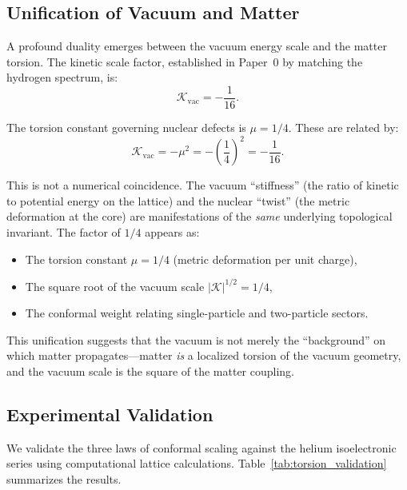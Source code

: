 \documentclass[aps,prd,twocolumn,superscriptaddress,groupedaddress,showpacs]{revtex4-2}
\begin{document}
\subsection{Unification of Vacuum and Matter}

A profound duality emerges between the vacuum energy scale and the matter torsion. The kinetic scale factor, established in Paper~0 by matching the hydrogen spectrum, is:
\begin{equation}
\mathcal{K}_{\text{vac}} = -\frac{1}{16}.
\label{eq:kvac}
\end{equation}

The torsion constant governing nuclear defects is $\mu = 1/4$. These are related by:
\begin{equation}
\mathcal{K}_{\text{vac}} = -\mu^2 = -\left(\frac{1}{4}\right)^2 = -\frac{1}{16}.
\label{eq:vacuum_matter_duality}
\end{equation}

This is not a numerical coincidence. The vacuum ``stiffness'' (the ratio of kinetic to potential energy on the lattice) and the nuclear ``twist'' (the metric deformation at the core) are manifestations of the \emph{same} underlying topological invariant. The factor of $1/4$ appears as:
\begin{itemize}
\item The torsion constant $\mu = 1/4$ (metric deformation per unit charge),
\item The square root of the vacuum scale $|\mathcal{K}|^{1/2} = 1/4$,
\item The conformal weight relating single-particle and two-particle sectors.
\end{itemize}

This unification suggests that the vacuum is not merely the ``background'' on which matter propagates---matter \emph{is} a localized torsion of the vacuum geometry, and the vacuum scale is the square of the matter coupling.

\subsection{Experimental Validation}

We validate the three laws of conformal scaling against the helium isoelectronic series using computational lattice calculations. Table~\ref{tab:torsion_validation} summarizes the results.
\end{document}
